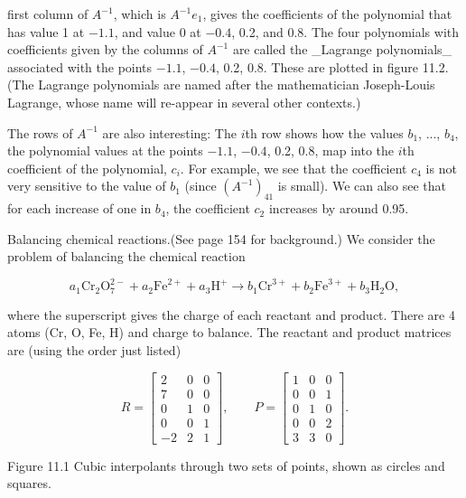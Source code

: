 first column of \(A^{-1}\), which is \(A^{-1}e_{1}\), gives the coefficients of the polynomial that has value 1 at \(-1.1\), and value 0 at \(-0.4\), 0.2, and 0.8. The four polynomials with coefficients given by the columns of \(A^{-1}\) are called the _Lagrange polynomials_ associated with the points \(-1.1\), \(-0.4\), 0.2, 0.8. These are plotted in figure 11.2. (The Lagrange polynomials are named after the mathematician Joseph-Louis Lagrange, whose name will re-appear in several other contexts.)

The rows of \(A^{-1}\) are also interesting: The \(i\)th row shows how the values \(b_{1}\), ..., \(b_{4}\), the polynomial values at the points \(-1.1\), \(-0.4\), 0.2, 0.8, map into the \(i\)th coefficient of the polynomial, \(c_{i}\). For example, we see that the coefficient \(c_{4}\) is not very sensitive to the value of \(b_{1}\) (since \((A^{-1})_{41}\) is small). We can also see that for each increase of one in \(b_{4}\), the coefficient \(c_{2}\) increases by around 0.95.

Balancing chemical reactions.(See page 154 for background.) We consider the problem of balancing the chemical reaction

\[a_{1}\mathrm{Cr}_{2}\mathrm{O}_{7}^{2-}+a_{2}\mathrm{Fe}^{2+}+a_{3}\mathrm{H} ^{+}\longrightarrow b_{1}\mathrm{Cr}^{3+}+b_{2}\mathrm{Fe}^{3+}+b_{3} \mathrm{H}_{2}\mathrm{O},\]

where the superscript gives the charge of each reactant and product. There are 4 atoms (Cr, O, Fe, H) and charge to balance. The reactant and product matrices are (using the order just listed)

\[R=\left[\begin{array}{ccc}2&0&0\\ 7&0&0\\ 0&1&0\\ 0&0&1\\ -2&2&1\end{array}\right],\qquad P=\left[\begin{array}{ccc}1&0&0\\ 0&0&1\\ 0&1&0\\ 0&0&2\\ 3&3&0\end{array}\right].\]

Figure 11.1 Cubic interpolants through two sets of points, shown as circles and squares.

 